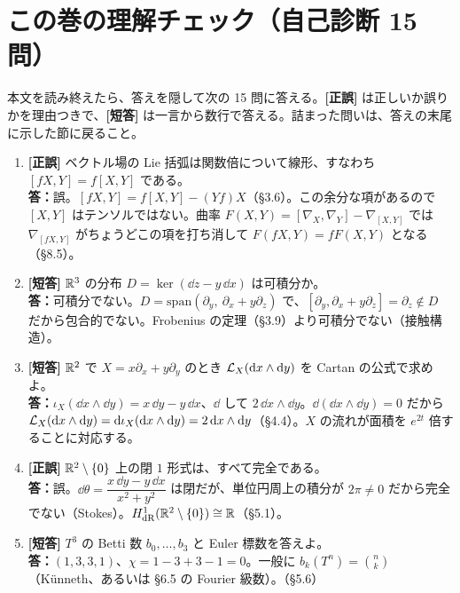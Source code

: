 \clearpage
\section*{この巻の理解チェック（自己診断 15 問）}
本文を読み終えたら、答えを隠して次の 15 問に答える。\textbf{[正誤]} は正しいか誤りかを理由つきで、\textbf{[短答]} は一言から数行で答える。詰まった問いは、答えの末尾に示した節に戻ること。

\begin{enumerate}[label=\textbf{Q\arabic*.},leftmargin=2.6em,itemsep=5pt]
\item \textbf{[正誤]} ベクトル場の Lie 括弧は関数倍について線形、すなわち $[fX,Y]=f[X,Y]$ である。\\
\textbf{答：}誤。$[fX,Y]=f[X,Y]-(Yf)X$（§3.6）。この余分な項があるので $[X,Y]$ はテンソルではない。曲率 $F(X,Y)=[\nabla_X,\nabla_Y]-\nabla_{[X,Y]}$ では $\nabla_{[fX,Y]}$ がちょうどこの項を打ち消して $F(fX,Y)=fF(X,Y)$ となる（§8.5）。

\item \textbf{[短答]} $\mathbb R^3$ の分布 $D=\ker(\dd z-y\,\dd x)$ は可積分か。\\
\textbf{答：}可積分でない。$D=\mathrm{span}(\partial_y,\ \partial_x+y\partial_z)$ で、$[\partial_y,\partial_x+y\partial_z]=\partial_z\notin D$ だから包合的でない。Frobenius の定理（§3.9）より可積分でない（接触構造）。

\item \textbf{[短答]} $\mathbb R^2$ で $X=x\partial_x+y\partial_y$ のとき $\mathcal L_X(\mathrm{d} x\wedge\mathrm{d} y)$ を Cartan の公式で求めよ。\\
\textbf{答：}$\iota_X(\dd x\wedge\dd y)=x\,\dd y-y\,\dd x$、$\dd$ して $2\,\dd x\wedge\dd y$。$\dd(\dd x\wedge\dd y)=0$ だから $\mathcal L_X(\mathrm{d} x\wedge\mathrm{d} y)=\mathrm{d}\iota_X(\mathrm{d} x\wedge\mathrm{d} y)=2\,\mathrm{d} x\wedge\mathrm{d} y$（§4.4）。$X$ の流れが面積を $e^{2t}$ 倍することに対応する。

\item \textbf{[正誤]} $\mathbb R^2\setminus\{0\}$ 上の閉 $1$ 形式は、すべて完全である。\\
\textbf{答：}誤。$\dd\theta=\dfrac{x\,\dd y-y\,\dd x}{x^2+y^2}$ は閉だが、単位円周上の積分が $2\pi\ne0$ だから完全でない（Stokes）。$H^1_{\rm dR}(\mathbb R^2\setminus\{0\})\cong\mathbb R$（§5.1）。

\item \textbf{[短答]} $T^3$ の Betti 数 $b_0,\dots,b_3$ と Euler 標数を答えよ。\\
\textbf{答：}$(1,3,3,1)$、$\chi=1-3+3-1=0$。一般に $b_k(T^n)=\binom nk$（Künneth、あるいは §6.5 の Fourier 級数）。（§5.6）


\end{enumerate}
